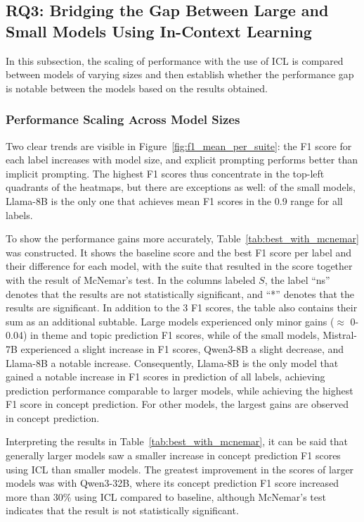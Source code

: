 \documentclass[english, 12pt, a4paper, sci, utf8, a-2b, online]{latex/definitions/aaltothesis}
\begin{document}
\subsection{RQ3: Bridging the Gap Between Large and Small Models Using In-Context Learning} \label{sec:rq3} %

In this subsection, the scaling of performance with the use of ICL is compared between models of varying sizes and then establish whether the performance gap is notable between the models based on the results obtained.

\subsubsection{Performance Scaling Across Model Sizes}

Two clear trends are visible in Figure~\ref{fig:f1_mean_per_suite}: the F1 score for each label increases with model size, and explicit prompting performs better than implicit prompting. The highest F1 scores thus concentrate in the top-left quadrants of the heatmaps, but there are exceptions as well: of the small models, Llama-8B is the only one that achieves mean F1 scores in the 0.9 range for all labels.



To show the performance gains more accurately, Table~\ref{tab:best_with_mcnemar} was constructed. It shows the baseline score and the best F1 score per label and their difference for each model, with the suite that resulted in the score together with the result of McNemar's test. In the columns labeled $S$, the label ``ns'' denotes that the results are not statistically significant, and ``*'' denotes that the results are significant. In addition to the 3 F1 scores, the table also contains their sum as an additional subtable. Large models experienced only minor gains ($\approx$ 0-0.04) in theme and topic prediction F1 scores, while of the small models, Mistral-7B experienced a slight increase in F1 scores, Qwen3-8B a slight decrease, and Llama-8B a notable increase. Consequently, Llama-8B is the only model that gained a notable increase in F1 scores in prediction of all labels, achieving prediction performance comparable to larger models, while achieving the highest F1 score in concept prediction. For other models, the largest gains are observed in concept prediction.

Interpreting the results in Table~\ref{tab:best_with_mcnemar}, it can be said that generally larger models saw a smaller increase in concept prediction F1 scores using ICL than smaller models. The greatest improvement in the scores of larger models was with Qwen3-32B, where its concept prediction F1 score increased more than 30\% using ICL compared to baseline, although McNemar’s test indicates that the result is not statistically significant.
\end{document}
